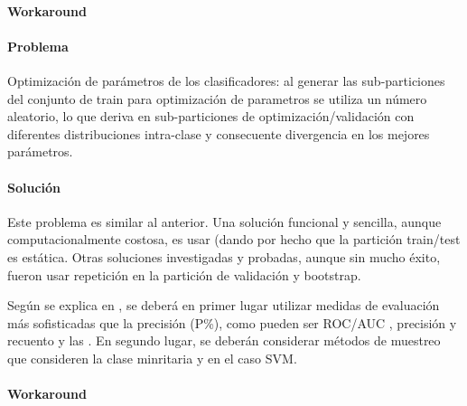\documentclass[12pt,bibliography=oldstyle,DIV=12,parskip=half-,titlepage]{scrartcl}
\begin{document}
\paragraph{Workaround}

\paragraph{Problema}
Optimización de parámetros de los clasificadores: al generar las
sub-particiones del conjunto de train para optimización de parametros
se utiliza un número aleatorio, lo que deriva en sub-particiones de
optimización/validación con diferentes distribuciones intra-clase y
consecuente divergencia en los mejores parámetros.


\paragraph{Solución}
Este problema es similar al anterior. Una solución funcional y
sencilla, aunque computacionalmente costosa, es usar
 (dando por hecho que la partición train/test es
estática. Otras soluciones investigadas y probadas, aunque sin mucho
éxito, fueron usar repetición en la partición de validación y
bootstrap.

Según se explica en \cite{weiss}, se deberá en primer lugar utilizar
medidas de evaluación más sofisticadas que la precisión (P\%), como
pueden ser ROC/AUC \cite{bradley}\cite{provost}, precisión y
recuento \cite{carvalho}\cite{japkowicz} y las 
\cite{vanrijsbergen}.  En segundo lugar, se deberán considerar métodos
de muestreo que consideren la clase minritaria
\cite{japkowicz1}\cite{weiss2} y \cite{yan} en el caso SVM.

\paragraph{Workaround}


\renewcommand{\bibfont}{\normalfont\footnotesize}
\printbibliography
\end{document}
